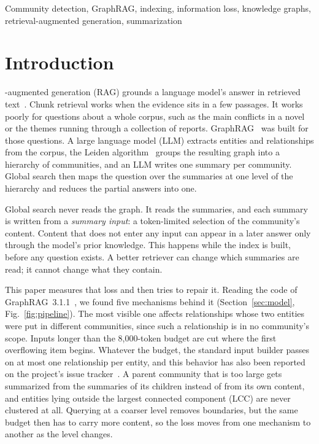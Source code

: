 \documentclass{ieeeaccess}
\theoremstyle{remark}
\begin{document}
\begin{keywords}
Community detection, GraphRAG, indexing, information loss, knowledge graphs, retrieval-augmented generation, summarization
\end{keywords}

\titlepgskip=-21pt

\maketitle

\section{Introduction}

-augmented generation (RAG) grounds a language model's answer in retrieved text~\cite{lewis2020rag,gao2023ragsurvey}. Chunk retrieval works when the evidence sits in a few passages. It works poorly for questions about a whole corpus, such as the main conflicts in a novel or the themes running through a collection of reports. GraphRAG~\cite{edge2024graphrag} was built for those questions. A large language model (LLM) extracts entities and relationships from the corpus, the Leiden algorithm~\cite{traag2019leiden} groups the resulting graph into a hierarchy of communities, and an LLM writes one summary per community. Global search then maps the question over the summaries at one level of the hierarchy and reduces the partial answers into one.

Global search never reads the graph. It reads the summaries, and each summary is written from a \emph{summary input}: a token-limited selection of the community's content. Content that does not enter any input can appear in a later answer only through the model's prior knowledge. This happens while the index is built, before any question exists. A better retriever can change which summaries are read; it cannot change what they contain.

This paper measures that loss and then tries to repair it. Reading the code of GraphRAG~3.1.1~\cite{graphrag311}, we found five mechanisms behind it (Section~\ref{sec:model}, Fig.~\ref{fig:pipeline}). The most visible one affects relationships whose two entities were put in different communities, since such a relationship is in no community's scope. Inputs longer than the 8,000-token budget are cut where the first overflowing item begins. Whatever the budget, the standard input builder passes on at most one relationship per entity, and this behavior has also been reported on the project's issue tracker~\cite{grenat2026issue}. A parent community that is too large gets summarized from the summaries of its children instead of from its own content, and entities lying outside the largest connected component (LCC) are never clustered at all. Querying at a coarser level removes boundaries, but the same budget then has to carry more content, so the loss moves from one mechanism to another as the level changes.
\end{document}
